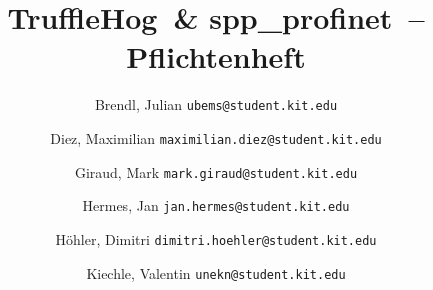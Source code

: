 \documentclass[a4paper]{scrreprt}
\newcommand{\sppname}{spp\_profinet}
\newcommand{\programname}{TruffleHog}
\begin{document}
\title{\programname \ \& \sppname \ -- Pflichtenheft}
\author{
    Brendl, Julian
    \texttt{ubems@student.kit.edu}
    \and
    Diez, Maximilian
    \texttt{maximilian.diez@student.kit.edu}
    \and
    Giraud, Mark
    \texttt{mark.giraud@student.kit.edu}
    \and
    Hermes, Jan
    \texttt{jan.hermes@student.kit.edu}
    \and
    Höhler, Dimitri
    \texttt{dimitri.hoehler@student.kit.edu}
    \and
    Kiechle, Valentin
    \texttt{unekn@student.kit.edu}
}
\maketitle



\newpage
\tableofcontents
\newpage
\listoffigures





















\appendix

\end{document}
